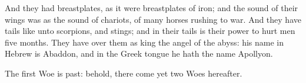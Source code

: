  And they had breastplates, as it were breastplates of iron; and the sound of their wings was as the sound of chariots, of many horses rushing to war. 
 And they have tails like unto scorpions, and stings; and in their tails is their power to hurt men five months. 
 They have over them as king the angel of the abyss: his name in Hebrew is Abaddon, and in the Greek tongue he hath the name Apollyon.

 The first Woe is past: behold, there come yet two Woes hereafter.

